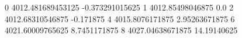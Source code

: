 0 4012.481689453125 -0.373291015625
1 4012.85498046875 0.0
2 4012.68310546875 -0.171875
4 4015.8076171875 2.95263671875
6 4021.60009765625 8.7451171875
8 4027.04638671875 14.19140625
